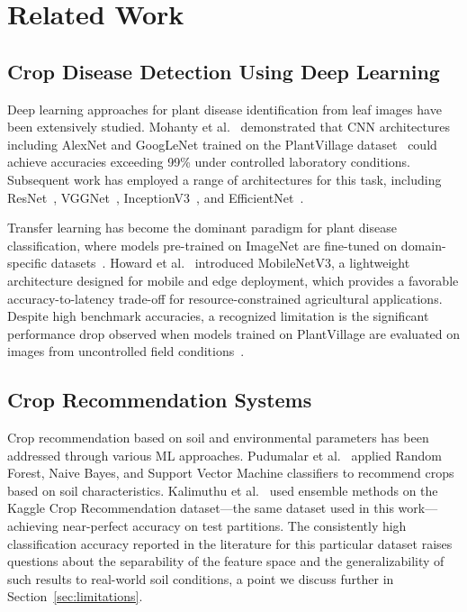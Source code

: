 \documentclass[conference]{IEEEtran}
\begin{document}
\section{Related Work}
\label{sec:related_work}

\subsection{Crop Disease Detection Using Deep Learning}

Deep learning approaches for plant disease identification from leaf images have been extensively studied. Mohanty et al.~\cite{mohanty2016using} demonstrated that CNN architectures including AlexNet and GoogLeNet trained on the PlantVillage dataset~\cite{hughes2015open} could achieve accuracies exceeding 99\% under controlled laboratory conditions. Subsequent work has employed a range of architectures for this task, including ResNet~\cite{he2016deep}, VGGNet~\cite{simonyan2015very}, InceptionV3~\cite{szegedy2016rethinking}, and EfficientNet~\cite{tan2019efficientnet}.

Transfer learning has become the dominant paradigm for plant disease classification, where models pre-trained on ImageNet are fine-tuned on domain-specific datasets~\cite{too2019comparative}. Howard et al.~\cite{howard2019searching} introduced MobileNetV3, a lightweight architecture designed for mobile and edge deployment, which provides a favorable accuracy-to-latency trade-off for resource-constrained agricultural applications. Despite high benchmark accuracies, a recognized limitation is the significant performance drop observed when models trained on PlantVillage are evaluated on images from uncontrolled field conditions~\cite{barbedo2018factors}.

\subsection{Crop Recommendation Systems}

Crop recommendation based on soil and environmental parameters has been addressed through various ML approaches. Pudumalar et al.~\cite{pudumalar2017crop} applied Random Forest, Naive Bayes, and Support Vector Machine classifiers to recommend crops based on soil characteristics. Kalimuthu et al.~\cite{kalimuthu2020crop} used ensemble methods on the Kaggle Crop Recommendation dataset---the same dataset used in this work---achieving near-perfect accuracy on test partitions. The consistently high classification accuracy reported in the literature for this particular dataset raises questions about the separability of the feature space and the generalizability of such results to real-world soil conditions, a point we discuss further in Section~\ref{sec:limitations}.
\end{document}

